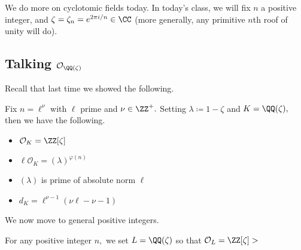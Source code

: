 \documentclass[../notes.tex]{subfiles}
\begin{document}














We do more on cyclotomic fields today. In today's class, we will fix $n$ a positive integer, and $\zeta=\zeta_n=e^{2\pi i/n}\in\CC$ (more generally, any primitive $n$th roof of unity will do).

\subsection{Talking \texorpdfstring{$\mathcal O_{\QQ(\zeta)}$}{}}
Recall that last time we showed the following.
\begin{proposition}
	Fix $n=\ell^\nu$ with $\ell$ prime and $\nu\in\ZZ^+.$ Setting $\lambda\coloneqq 1-\zeta$ and $K=\QQ(\zeta),$ then we have the following.
	\begin{itemize}
		\item $\mathcal O_K=\ZZ[\zeta]$
		\item $\ell\mathcal O_K=(\lambda)^{\varphi(n)}$
		\item $(\lambda)$ is prime of absolute norm $\ell$
		\item $d_K=\ell^{\nu-1}(\nu\ell-\nu-1)$
	\end{itemize}
\end{proposition}
We now move to general positive integers.
\begin{proposition}
	For any positive integer $n,$ we set $L=\QQ(\zeta)$ so that $\mathcal O_L=\ZZ[\zeta]>$
\end{proposition}
\end{document}
